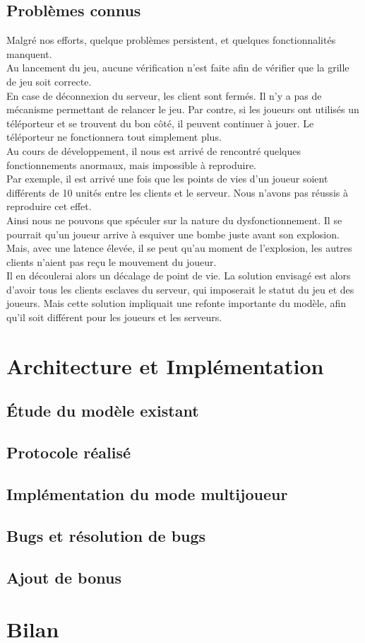 \documentclass[12pt]{article}
\begin{document}
\subsection{Problèmes connus}
Malgré nos efforts, quelque problèmes persistent, et quelques fonctionnalités manquent.\\
Au lancement du jeu, aucune vérification n'est faite afin de vérifier que la grille de jeu soit correcte.\\
En case de déconnexion du serveur, les client sont fermés. Il n'y a pas de mécanisme permettant de relancer le jeu.
Par contre, si les joueurs ont utilisés un téléporteur et se trouvent du bon côté, il peuvent continuer à jouer. Le téléporteur ne fonctionnera tout simplement plus.
\\
Au cours de développement, il nous est arrivé de rencontré quelques fonctionnements anormaux, mais impossible à reproduire.\\
Par exemple, il est arrivé une fois que les points de vies d'un joueur soient différents de 10 unités entre les clients et le serveur. Nous n'avons pas réussis à reproduire cet effet.\\
Ainsi nous ne pouvons que spéculer sur la nature du dysfonctionnement.
Il se pourrait qu'un joueur arrive à esquiver une bombe juste avant son explosion.\\
Mais, avec une latence élevée, il se peut qu'au moment de l'explosion, les autres clients n'aient pas reçu le mouvement du joueur.\\
Il en découlerai alors un décalage de point de vie.
La solution envisagé est alors d'avoir tous les clients esclaves du serveur, qui imposerait le statut du jeu et des joueurs. Mais cette solution impliquait une refonte importante du modèle, afin qu'il soit différent pour les joueurs et les serveurs.
\newpage

\section{Architecture et Implémentation}
\subsection{Étude du modèle existant}

\subsection{Protocole réalisé}

\subsection{Implémentation du mode multijoueur}

\subsection{Bugs et résolution de bugs}

\subsection{Ajout de bonus}
\newpage

\section{Bilan}
\end{document}
